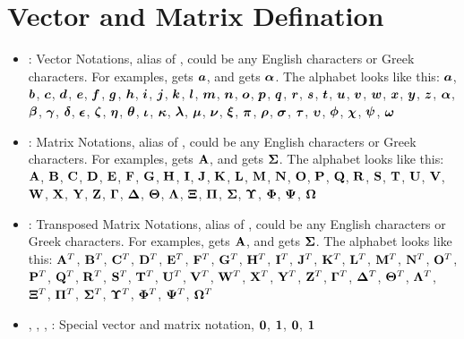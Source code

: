 \documentclass{article}
\begin{document}
\section{Vector and Matrix Defination}
\begin{itemize}
\item {}: Vector Notations, alias of , \code{*} could be any English characters or Greek characters. For examples,  gets ${\bm a}$, and  gets ${\bm \alpha}$. The alphabet looks like this: ${\bm a}$, ${\bm b}$, ${\bm c}$, ${\bm d}$, ${\bm e}$, ${\bm f}$, ${\bm g}$, ${\bm h}$, ${\bm i}$, ${\bm j}$, ${\bm k}$, ${\bm l}$, ${\bm m}$, ${\bm n}$, ${\bm o}$, ${\bm p}$, ${\bm q}$, ${\bm r}$, ${\bm s}$, ${\bm t}$, ${\bm u}$, ${\bm v}$, ${\bm w}$, ${\bm x}$, ${\bm y}$, ${\bm z}$, ${\bm \alpha}$, ${\bm \beta}$, ${\bm \gamma}$, ${\bm \delta}$, ${\bm \epsilon}$, ${\bm \zeta}$, ${\bm \eta}$, ${\bm \theta}$, ${\bm \iota}$, ${\bm \kappa}$, ${\bm \lambda}$, ${\bm \mu}$, ${\bm \nu}$, ${\bm \xi}$, ${\bm \pi}$, ${\bm \rho}$, ${\bm \sigma}$, ${\bm \tau}$, ${\bm \upsilon}$, ${\bm \phi}$, ${\bm \chi}$, ${\bm \psi}$, ${\bm \omega}$
\item {}: Matrix Notations, alias of , \code{*} could be any English characters or Greek characters. For examples,  gets ${\mathbf A}$, and  gets ${\bm \Sigma}$. The alphabet looks like this: ${\mathbf A}$, ${\mathbf B}$, ${\mathbf C}$, ${\mathbf D}$, ${\mathbf E}$, ${\mathbf F}$, ${\mathbf G}$, ${\mathbf H}$, ${\mathbf I}$, ${\mathbf J}$, ${\mathbf K}$, ${\mathbf L}$, ${\mathbf M}$, ${\mathbf N}$, ${\mathbf O}$, ${\mathbf P}$, ${\mathbf Q}$, ${\mathbf R}$, ${\mathbf S}$, ${\mathbf T}$, ${\mathbf U}$, ${\mathbf V}$, ${\mathbf W}$, ${\mathbf X}$, ${\mathbf Y}$, ${\mathbf Z}$, ${\bm \Gamma}$, ${\bm \Delta}$, ${\bm \Theta}$, ${\bm \Lambda}$, ${\bm \Xi}$, ${\bm \Pi}$, ${\bm \Sigma}$, ${\bm \Upsilon}$, ${\bm \Phi}$, ${\bm \Psi}$, ${\bm \Omega}$
\item {}: Transposed Matrix Notations, alias of , \code{*} could be any English characters or Greek characters. For examples,  gets ${\mathbf A}$, and  gets ${\bm \Sigma}$. The alphabet looks like this: ${{\mathbf A}^T}$, ${{\mathbf B}^T}$, ${{\mathbf C}^T}$, ${{\mathbf D}^T}$, ${{\mathbf E}^T}$, ${{\mathbf F}^T}$, ${{\mathbf G}^T}$, ${{\mathbf H}^T}$, ${{\mathbf I}^T}$, ${{\mathbf J}^T}$, ${{\mathbf K}^T}$, ${{\mathbf L}^T}$, ${{\mathbf M}^T}$, ${{\mathbf N}^T}$, ${{\mathbf O}^T}$, ${{\mathbf P}^T}$, ${{\mathbf Q}^T}$, ${{\mathbf R}^T}$, ${{\mathbf S}^T}$, ${{\mathbf T}^T}$, ${{\mathbf U}^T}$, ${{\mathbf V}^T}$, ${{\mathbf W}^T}$, ${{\mathbf X}^T}$, ${{\mathbf Y}^T}$, ${{\mathbf Z}^T}$, ${{\bm \Gamma}^T}$, ${{\bm \Delta}^T}$, ${{\bm \Theta}^T}$, ${{\bm \Lambda}^T}$, ${{\bm \Xi}^T}$, ${{\bm \Pi}^T}$, ${{\bm \Sigma}^T}$, ${{\bm \Upsilon}^T}$, ${{\bm \Phi}^T}$, ${{\bm \Psi}^T}$, ${{\bm \Omega}^T}$
\item {}, , , : Special vector and matrix notation, ${\bm 0}$, ${\bm 1}$, ${\mathbf 0}$, ${\mathbf 1}$
\end{itemize}
\end{document}
